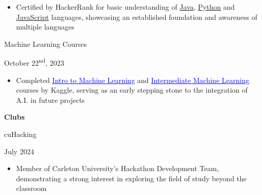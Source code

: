 \documentclass[a4paper,11pt]{article}
\begin{document}
 \begin{minipage}{\linewidth}
 \vspace{10pt}
\begin{itemize}
    \item Certified by HackerRank for basic understanding of \href{https://www.hackerrank.com/certificates/fbcafb873c96}{\uline{Java}}, \href{https://www.hackerrank.com/certificates/4a8e6ae17626}{\uline{Python}} and \href{https://www.hackerrank.com/certificates/b4b9cb2f4e4a}{\uline{JavaScript}} languages, showcasing an established foundation and awareness of multiple languages
\end{itemize}

 \vspace{1pt}
 \end{minipage}
  \begin{minipage}{.65\linewidth}
     Machine Learning Courses 
 \end{minipage}
 \begin{minipage}{.34\linewidth}
     \flushright
     October 22\textsuperscript{nd}, 2023
 \end{minipage}
 \begin{minipage}{\linewidth}
 \vspace{10pt}
 \begin{itemize}
     \item Completed \href{https://www.kaggle.com/learn/certification/jeremyfriesen123/intro-to-machine-learning}{\textcolor{blue}{\uline{Intro to Machine Learning}}} and \href{https://www.kaggle.com/learn/certification/jeremyfriesen123/intermediate-machine-learning}{\textcolor{blue}{\uline{Intermediate Machine Learning}}} courses by Kaggle, serving as an early stepping stone to the integration of A.I. in future projects
 \end{itemize}
 \vspace{1pt}
 \end{minipage}

 \begin{minipage}{.65\linewidth}
     \textbf{Clubs}
 \end{minipage}

\begin{minipage}{.65\linewidth}
    cuHacking
\end{minipage}%
\begin{minipage}{.34\linewidth}
    \flushright
    July 2024
\end{minipage}


\begin{minipage}{\linewidth}
 \vspace{10pt}
 \begin{itemize}
     \item Member of Carleton University's Hackathon Development Team, demonstrating a strong interest in exploring the field of study beyond the classroom
 \end{itemize}
 \vspace{1pt}
 \end{minipage}
\end{document}
